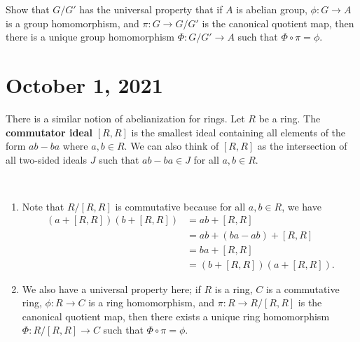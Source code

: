 \begin{exercise}
    Show that $G/G'$ has the universal property that if $A$ is abelian 
    group, $\phi : G \to A$ is a group homomorphism, and $\pi 
    : G \to G/G'$ is the canonical quotient map, then there is a 
    unique group homomorphism $\Phi : G/G' \to A$ such that 
    $\Phi \circ \pi = \phi$. 

    \begin{center}
    \end{center}
\end{exercise}

\section{October 1, 2021}
There is a similar notion of abelianization for rings. Let $R$ 
be a ring. The {\bf commutator ideal} $[R, R]$ is the smallest ideal 
containing all elements of the form $ab - ba$ where $a, b \in R$. 
We can also think of $[R, R]$ as the intersection of all two-sided ideals 
$J$ such that $ab - ba \in J$ for all $a, b \in R$. 

\begin{remark}~
    \begin{enumerate}[(1)]
        \item Note that $R/[R, R]$ is commutative because for all $a, b \in R$, 
        we have 
        \begin{align*}
            (a + [R, R])(b + [R, R]) 
            &= ab + [R, R] \\ 
            &= ab + (ba - ab) + [R, R] \\
            &= ba + [R, R] \\
            &= (b + [R, R])(a + [R, R]).
        \end{align*}
        \item We also have a universal property here; if $R$ is a ring, 
        $C$ is a commutative ring, $\phi : R \to C$ is a ring homomorphism, 
        and $\pi : R \to R/[R, R]$ is the canonical quotient map, then 
        there exists a unique ring homomorphism $\Phi : R/[R, R] \to C$ 
        such that $\Phi \circ \pi = \phi$. 
        \begin{center}
        \end{center}
    \end{enumerate}
\end{remark}

